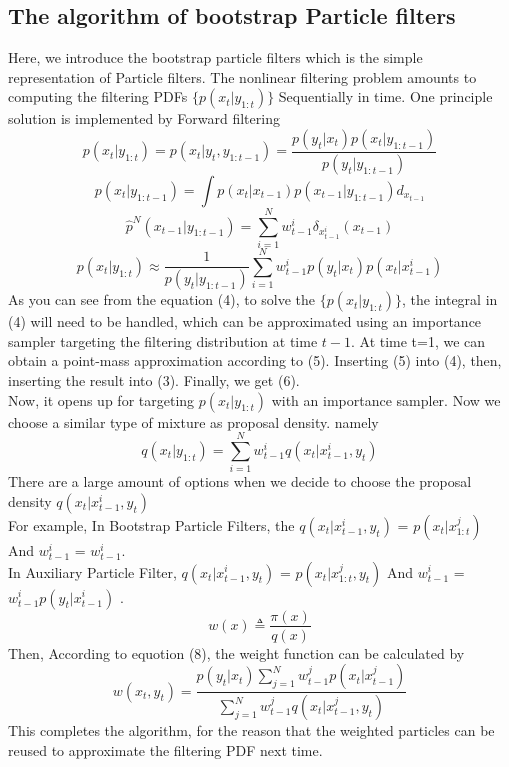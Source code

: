 \documentclass[11pt,oneside,a4paper]{article}
\begin{document}
\subsection{The algorithm of bootstrap Particle filters}

Here, we introduce the bootstrap particle filters which is the simple representation of Particle filters.
The nonlinear filtering problem amounts to computing the filtering PDFs $ \{ p(x_t|y_{1:t}) \}$ Sequentially in time.
One principle solution is implemented by Forward filtering\\


\begin{equation}
p(x_t | y_{1:t}) = p(x_t | y_t, y_{1:t-1}) = \frac{p(y_t|x_t)p(x_t|y_{1:t-1})}{p(y_t|y_{1:t-1})}
\end{equation}
\begin{equation}
p(x_t | y_{1:t-1}) = \int p(x_t|x_{t-1})p(x_{t-1}|y_{1:t-1}) d_{x_{t-1}}
\end{equation}
\begin{equation}
\hat{p}^N(x_{t-1}|y_{1:t-1}) = \sum_{i=1}^N w_{t-1}^i\delta_{x_{t-1}^i}(x_{t-1})
\end{equation}
\begin{equation}
p(x_t|y_{1:t}) \approx \frac{1}{p(y_t|y_{1:t-1})} \sum_{i=1}^N w_{t-1}^i p(y_t|x_t)p(x_t|x_{t-1}^i)
\end{equation}
As you can see from the equation (4), to solve the $ \{ p(x_t|y_{1:t}) \}$, the integral in (4) will need to be handled, which can be approximated using an importance sampler
targeting the filtering distribution at time $t-1$.
At time t=1, we can obtain a point-mass approximation according to (5).
Inserting (5) into (4), then, inserting the result into (3). Finally, we get
(6).\\
Now, it opens up for targeting $p(x_t|y_{1:t})$ with an importance sampler. Now we choose a similar type of mixture as proposal density. namely
\begin{equation}
q(x_t|y_{1:t}) = \sum_{i=1}^N w_{t-1}^i q(x_t|x_{t-1}^i,y_t)
\end{equation}
There are a large amount of options when we decide to choose the proposal density $q(x_t | x_{t-1}^i, y_t)$
\\
For example, In Bootstrap Particle Filters, the $q(x_t|x_{t-1}^i,y_t)$ = $p(x_t|x_{1:t}^j)$ And $w_{t-1}^i$ = $w_{t-1}^i$.
\\
In Auxiliary Particle Filter, $q(x_t|x_{t-1}^i,y_t)$ = $p(x_t|x_{1:t}^j, y_t)$ And $w_{t-1}^i$ = $w_{t-1}^i p(y_t|x_{t-1}^i)$ .
\\
\begin{equation}
  w(x) \triangleq \frac{\pi(x)}{q(x)}
\end{equation}
Then, According to equotion (8), the weight function can be calculated by
\begin{equation}
 w(x_t,y_t) = \frac{p(y_t|x_t) \sum_{j=1}^N w_{t-1}^j p(x_t|x_{t-1}^j)}{\sum_{j=1}^N w_{t-1}^j q(x_t|x_{t-1}^j, y_t)}
\end{equation}
This completes the algorithm, for the reason that the weighted particles can be reused to approximate the filtering PDF next time.
\end{document}
